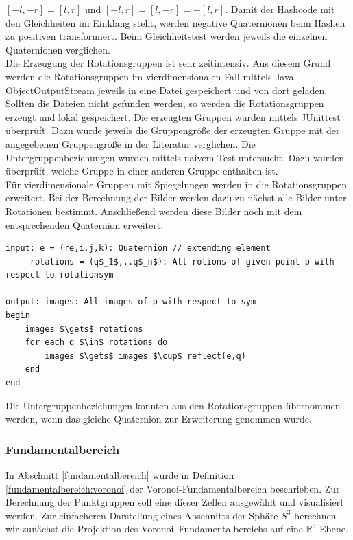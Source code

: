 $[-l,-r] = [l,r]$ und $[-l,r]=[l,-r]=-[l,r]$. Damit der Hashcode mit den Gleichheiten im Einklang steht, werden negative Quaternionen beim Hashen zu positiven transformiert. Beim Gleichheitstest werden jeweils die einzelnen Quaternionen verglichen.\\
Die Erzeugung der Rotationsgruppen ist sehr zeitintensiv. Aus diesem Grund werden die Rotationsgruppen im vierdimensionalen Fall mittels Java-ObjectOutputStream jeweils in eine Datei gespeichert und von dort geladen. Sollten die Dateien nicht gefunden werden, so werden die Rotationsgruppen erzeugt und lokal gespeichert. Die erzeugten Gruppen wurden mittels JUnittest überprüft. Dazu wurde jeweils die Gruppengröße der erzeugten Gruppe mit der angegebenen Gruppengröße in der Literatur verglichen. Die Untergruppenbeziehungen wurden mittels naivem Test untersucht. Dazu wurden überprüft, welche Gruppe in einer anderen Gruppe enthalten ist.\\
Für vierdimensionale Gruppen mit Spiegelungen werden in die Rotationsgruppen erweitert. Bei der Berechnung der Bilder werden dazu zu nächst alle Bilder unter Rotationen bestimmt. Anschließend werden diese Bilder noch mit dem entsprechenden Quaternion erweitert.
\begin{lstlisting}[mathescape, morekeywords={for, each, if, then, fi, do, begin,input, output, end, return}, caption={Peusdocode für Bilder unter Spiegelungen}, label=alg:images2]
input: e = (re,i,j,k): Quaternion // extending element
	 rotations = (q$_1$,..q$_n$): All rotions of given point p with respect to rotationsym
	
output: images: All images of p with respect to sym
begin	
	images $\gets$ rotations
	for each q $\in$ rotations do
		images $\gets$ images $\cup$ reflect(e,q)
	end
end 
\end{lstlisting}
Die Untergruppenbeziehungen konnten aus den Rotationsgruppen übernommen werden, wenn das gleiche Quaternion zur Erweiterung genommen wurde.
\\ 


    \subsubsection{Fundamentalbereich}
         In Abschnitt \ref{fundamentalbereich} wurde in Definition \ref{fundamentalbereich:voronoi} der Voronoi-Fundamentalbereich beschrieben. Zur Berechnung der Punktgruppen soll eine dieser Zellen ausgewählt und visualisiert werden.
         Zur einfacheren Darstellung eines Abschnitts der Sphäre $S^3$ berechnen wir zunächst die Projektion des Voronoi--Fundamentalbereichs auf eine $\mathbb{R}^3$ Ebene.
